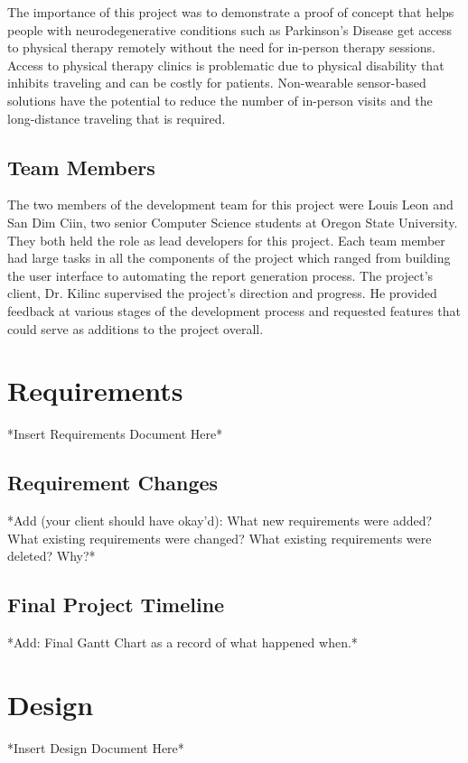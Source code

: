 \documentclass[onecolumn, draftclsnofoot,10pt, compsoc]{IEEEtran}
\begin{document}
The importance of this project was to demonstrate a proof of concept that helps people with neurodegenerative conditions such as Parkinson's Disease get access to physical therapy remotely without the need for in-person therapy sessions. Access to physical therapy clinics is problematic due to physical disability that inhibits traveling and can be costly for patients. Non-wearable sensor-based solutions have the potential to reduce the number of in-person visits and the long-distance traveling that is required. 

\subsection{Team Members}
The two members of the development team for this project were Louis Leon and San Dim Ciin, two senior Computer Science students at Oregon State University. They both held the role as lead developers for this project. Each team member had large tasks in all the components of the project which ranged from building the user interface to automating the report generation process. The project's client, Dr. Kilinc supervised the project's direction and progress. He provided feedback at various stages of the development process and requested features that could serve as additions to the project overall. 

\section{Requirements}
*Insert Requirements Document Here*
  
\subsection{Requirement Changes}
*Add (your client should have okay'd): What new requirements were added? What existing requirements were changed? What existing requirements were deleted? Why?* 
\subsection{Final Project Timeline}
*Add: Final Gantt Chart as a record of what happened when.* 


\section{Design}
*Insert Design Document Here*
  
\cite{KinectDevelop}
\end{document}

